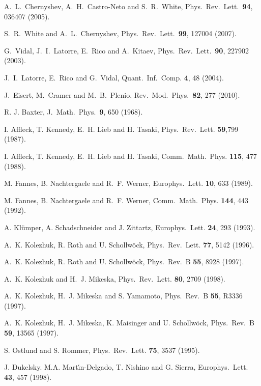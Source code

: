 A.~L.~Chernyshev, A.~H.~Castro-Neto and S.~R.~White, Phys.\ Rev.\ Lett.\ {\bf 94}, 036407 (2005).

S.~R.~White and A.~L.~Chernyshev, Phys.\ Rev.\ Lett.\ {\bf 99}, 127004 (2007).

G.~Vidal, J.~I.~Latorre, E.~Rico and A.~Kitaev, Phys.\ Rev.\ Lett.\ {\bf 90}, 227902 (2003).

J.~I.~Latorre, E.~Rico and G.~Vidal, Quant.\ Inf.\ Comp. {\bf 4}, 48 (2004).

J.~Eisert, M.~Cramer and M.~B.~Plenio, Rev.\ Mod.\ Phys.\ {\bf 82}, 277 (2010).

R. J. Baxter, J.\ Math.\ Phys.\ {\bf 9}, 650 (1968).

I. Affleck, T. Kennedy, E.~H. Lieb and H. Tasaki, Phys.\ Rev.\ Lett. {\bf 59},799 (1987).

I. Affleck, T. Kennedy, E.~H. Lieb and H. Tasaki, Comm.\ Math.\ Phys. {\bf 115}, 477 (1988).

M. Fannes, B. Nachtergaele and R.~F. Werner, Europhys.\ Lett. {\bf 10}, 633 (1989).

M. Fannes, B. Nachtergaele and R.~F. Werner,
Comm.\ Math.\ Phys. {\bf 144}, 443 (1992).

A. Kl\"{u}mper, A. Schadschneider and J. Zittartz,
Europhys.\ Lett. {\bf 24}, 293 (1993).

A.~K. Kolezhuk, R. Roth and U. Schollw\"{o}ck, Phys.\ Rev.\ Lett. {\bf 77}, 5142 (1996).

A.~K. Kolezhuk, R. Roth and U. Schollw\"{o}ck, Phys.\ Rev.\ B {\bf 55}, 8928 (1997).

A.~K. Kolezhuk and H.~J. Mikeska, Phys.\ Rev.\ Lett. {\bf 80}, 2709 (1998).

A.~K. Kolezhuk, H.~J. Mikeska and S. Yamamoto, Phys.\ Rev.\ B {\bf 55}, R3336 (1997).

A.~K. Kolezhuk, H.~J. Mikeska, K. Maisinger and U. Schollw\"{o}ck, Phys.\ Rev.\ B {\bf 59}, 13565 (1997).

S. Ostlund and S. Rommer, Phys.\ Rev.\ Lett. {\bf 75}, 3537 (1995).

J. Dukelsky. M.A. Mart\'{\i}n-Delgado, T. Nishino and G. Sierra, Europhys.\ Lett. {\bf 43}, 457 (1998).

